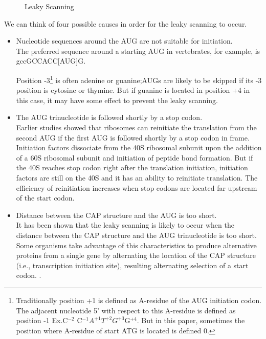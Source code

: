 \begin{figure}
\begin{center}
\end{center}
\caption{Leaky Scanning}
\label{dscr4}
\end{figure}

We can think of four possible causes in order for the leaky scanning to
occur.

\begin{itemize}
\item Nucleotide sequences around the AUG are not suitable for
initiation. \\
The preferred sequence around a starting AUG in
vertebrates, for example, is gccGCCACC[AUG]G\cite{label3}.

Position -3\footnote{Traditionally 
position +1 is defined as A-residue of the AUG initiation codon. The adjacent
nucleotide 5' with respect to this A-residue is defined as position -1
 Ex.C$^{-2}$
C$^{-1}$$A^{+1}T^{+2}G^{+3}$G$^{+4}$. But in this paper,
sometimes the position where A-residue of start ATG is located is defined 0.}
is often adenine or guanine\cite{label4};AUGs are likely to be skipped
if its -3 position is cytosine or thymine. But if guanine is
located in position +4 in this case, it may have some effect to
prevent the leaky scanning. 

\item The AUG trinucleotide is followed shortly by a stop codon.\\
Earlier studies showed that
ribosomes can reinitiate the translation from the second AUG 
if the first AUG is followed shortly by a stop codon in frame. Initiation 
factors dissociate from the 40S ribosomal subunit upon the addition of 
a 60S ribosomal subunit and initiation of peptide bond formation. But
if the 40S reaches stop codon right after the translation initiation, 
initiation factors are still on the 40S and it has an ability to
reinitiate translation\cite{label4}. The
efficiency of reinitiation increases when stop codons are located far
upstream of the start codon\cite{label18}.

\item Distance between the CAP structure and the AUG is too
short.\\  It has been shown that the leaky scanning is likely to occur
when the distance between the CAP structure and the AUG trinucleotide is too
short\cite{label19}.  
Some organisms take advantage of this characteristics to produce
alternative proteins from a single gene by alternating
the location of the CAP structure (i.e., transcription initiation site),
resulting alternating selection of a start codon.
\cite{label5}.


\end{itemize}
